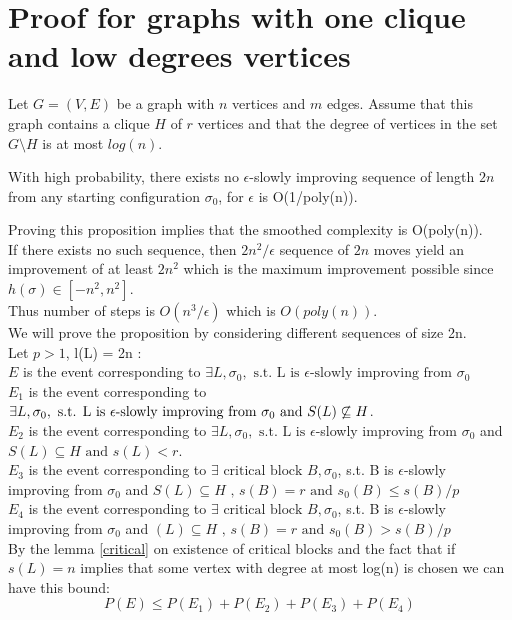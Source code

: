 \section{Proof for graphs with one clique and low degrees vertices}
Let $G = (V,E)$ be a graph with $n$ vertices and $m$ edges. Assume that this graph contains a clique $H$ of $r$ vertices and that the degree of vertices in the set $G \setminus H$ is at most $log(n)$. \\

\begin{proposition}
\label{prop}
With high probability, there exists no $\epsilon$-slowly improving sequence of length $2n$ from any starting configuration $\sigma_0$, for $\epsilon$ is O(1/poly(n)).
\end{proposition}

Proving this proposition implies that the smoothed complexity is O(poly(n)). \\
If there exists no such sequence, then $2n^2/\epsilon$ sequence of $2n$ moves yield an improvement of at least $2n^2$ which is the maximum improvement possible since $h(\sigma) \in [-n^2,n^2]$. \\
Thus number of steps is $O(n^3/\epsilon)$ which is $O(poly(n))$. \\

We will prove the proposition by considering different sequences of size 2n.\\
Let $ p > 1$, l(L) = 2n : \\
$E$ is the event corresponding to $\exists L, \sigma_0, \text{ s.t. L is }\epsilon\text{-slowly improving from }\sigma_0 $\\
$E_1$ is the event corresponding to $\exists L, \sigma_0, \text{ s.t. L is }\epsilon\text{-slowly improving from }\sigma_0 \\
\text{ and }S(L) \not\subseteq H$.\\
$E_2$ is the event corresponding to $\exists L, \sigma_0,\text{ s.t. L is }\epsilon$-slowly  improving from $\sigma_0$ and $S(L) \subseteq H\text{ and }s(L) < r$. \\
$E_3$   is the event corresponding to $\exists \text{ critical block } B, \sigma_0$, s.t. B is $\epsilon$-slowly improving from $\sigma_0$ and $S(L) \subseteq H \text{ , } s(B) = r \text{ and } s_0(B) \leq s(B) / p$ \\
$E_4$   is the event corresponding to $\exists \text{ critical block } B, \sigma_0$, s.t. B is $\epsilon$-slowly improving from $\sigma_0$ and $(L) \subseteq H \text{ , } s(B) = r \text{ and } s_0(B) > s(B) / p$ \\
By the lemma \ref{critical} on existence of critical blocks and the fact that if $s(L) = n$ implies that some vertex with degree at most log(n) is chosen we can have this bound:
\begin{equation*}
P(E) \leq P(E_1) + P(E_2) + P(E_3) + P(E_4)
\end{equation*}


